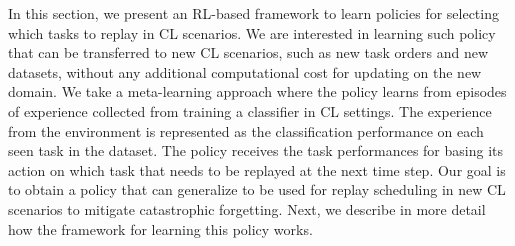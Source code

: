 In this section, we present an RL-based framework to learn policies for selecting which tasks to replay in CL scenarios. We are interested in learning such policy that can be transferred to new CL scenarios, such as new task orders and new datasets, without any additional computational cost for updating on the new domain. We take a meta-learning approach where the policy learns from episodes of experience collected from training a classifier in CL settings. The experience from the environment is represented as the classification performance on each seen task in the dataset. The policy receives the task performances for basing its action on which task that needs to be replayed at the next time step. Our goal is to obtain a policy that can generalize to be used for replay scheduling in new CL scenarios to mitigate catastrophic forgetting. Next, we describe in more detail how the framework for learning this policy works.




